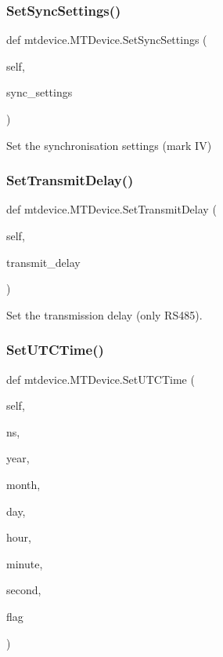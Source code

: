 \subsubsection{\texorpdfstring{Set\+Sync\+Settings()}{SetSyncSettings()}}
{\footnotesize\ttfamily def mtdevice.\+M\+T\+Device.\+Set\+Sync\+Settings (\begin{DoxyParamCaption}\item[{}]{self,  }\item[{}]{sync\+\_\+settings }\end{DoxyParamCaption})}

\begin{DoxyVerb}Set the synchronisation settings (mark IV)\end{DoxyVerb}
 \mbox{\label{classmtdevice_1_1MTDevice_a439b399cd20ca95cfad6225f368651f2}} 
\subsubsection{\texorpdfstring{Set\+Transmit\+Delay()}{SetTransmitDelay()}}
{\footnotesize\ttfamily def mtdevice.\+M\+T\+Device.\+Set\+Transmit\+Delay (\begin{DoxyParamCaption}\item[{}]{self,  }\item[{}]{transmit\+\_\+delay }\end{DoxyParamCaption})}

\begin{DoxyVerb}Set the transmission delay (only RS485).\end{DoxyVerb}
 \mbox{\label{classmtdevice_1_1MTDevice_a8e431e7cfdf17e72d9bdc1eddcf80d43}} 
\subsubsection{\texorpdfstring{Set\+U\+T\+C\+Time()}{SetUTCTime()}}
{\footnotesize\ttfamily def mtdevice.\+M\+T\+Device.\+Set\+U\+T\+C\+Time (\begin{DoxyParamCaption}\item[{}]{self,  }\item[{}]{ns,  }\item[{}]{year,  }\item[{}]{month,  }\item[{}]{day,  }\item[{}]{hour,  }\item[{}]{minute,  }\item[{}]{second,  }\item[{}]{flag }\end{DoxyParamCaption})}

